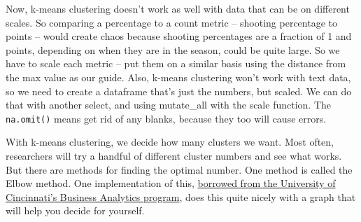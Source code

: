 \documentclass[]{book}
\newenvironment{Shaded}{\begin{snugshade}}{\end{snugshade}}
\newcommand{\DataTypeTok}[1]{\textcolor[rgb]{0.13,0.29,0.53}{#1}}
\newcommand{\DecValTok}[1]{\textcolor[rgb]{0.00,0.00,0.81}{#1}}
\newcommand{\KeywordTok}[1]{\textcolor[rgb]{0.13,0.29,0.53}{\textbf{#1}}}
\newcommand{\NormalTok}[1]{#1}
\newcommand{\OperatorTok}[1]{\textcolor[rgb]{0.81,0.36,0.00}{\textbf{#1}}}
\newcommand{\StringTok}[1]{\textcolor[rgb]{0.31,0.60,0.02}{#1}}
\begin{document}
\begin{Shaded}
\end{Shaded}

Now, k-means clustering doesn't work as well with data that can be on different scales. So comparing a percentage to a count metric -- shooting percentage to points -- would create chaos because shooting percentages are a fraction of 1 and points, depending on when they are in the season, could be quite large. So we have to scale each metric -- put them on a similar basis using the distance from the max value as our guide. Also, k-means clustering won't work with text data, so we need to create a dataframe that's just the numbers, but scaled. We can do that with another select, and using mutate\_all with the scale function. The \texttt{na.omit()} means get rid of any blanks, because they too will cause errors.

\begin{Shaded}
\end{Shaded}

With k-means clustering, we decide how many clusters we want. Most often, researchers will try a handful of different cluster numbers and see what works. But there are methods for finding the optimal number. One method is called the Elbow method. One implementation of this, \href{https://uc-r.github.io/kmeans_clustering}{borrowed from the University of Cincinnati's Business Analytics program}, does this quite nicely with a graph that will help you decide for yourself.
\end{document}

